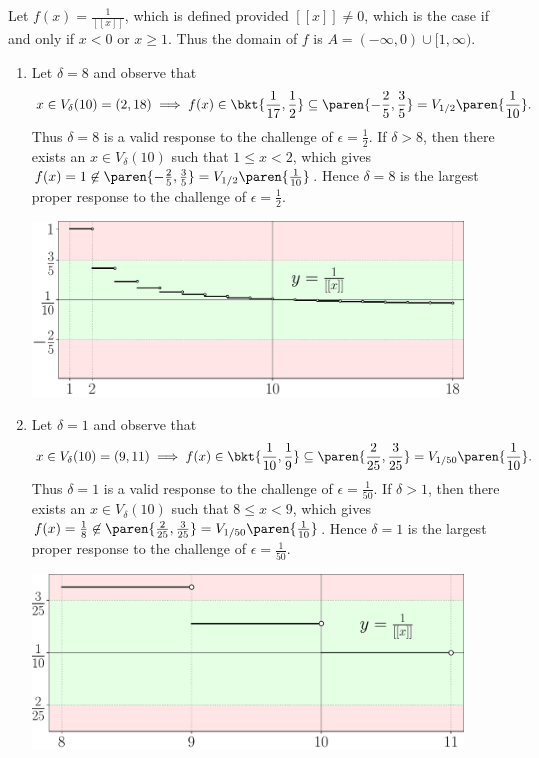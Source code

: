 \documentclass{lew98_solutions}
\begin{document}
\begin{solution}
    Let \( f(x) = \tfrac{1}{[[x]]} \), which is defined provided \( [[x]] \neq 0 \), which is the case if and only if \( x < 0 \) or \( x \geq 1 \). Thus the domain of \( f \) is \( A = (-\infty, 0) \cup [1, \infty) \).
    \begin{enumerate}
        \item Let \( \delta = 8 \) and observe that
        \[
            x \in V_{\delta}(10) = (2, 18) \implies f(x) \in \bkt{ \frac{1}{17}, \frac{1}{2} } \subseteq \paren{ -\frac{2}{5}, \frac{3}{5} } = V_{1/2}\paren{ \frac{1}{10} }.
        \]
        Thus \( \delta = 8 \) is a valid response to the challenge of \( \epsilon = \tfrac{1}{2} \). If \( \delta > 8 \), then there exists an \( x \in V_{\delta}(10) \) such that \( 1 \leq x < 2 \), which gives \( f(x) = 1 \not\in \paren{ -\tfrac{2}{5}, \tfrac{3}{5} } = V_{1/2} \paren{ \tfrac{1}{10} } \). Hence \( \delta = 8 \) is the largest proper response to the challenge of \( \epsilon = \tfrac{1}{2} \).
        \begin{center}
            \includegraphics[width=0.9\textwidth]{UA_Figures/UA_ex4_2_4_fig_1.pdf}
        \end{center}

        \item Let \( \delta = 1 \) and observe that
        \[
            x \in V_{\delta}(10) = (9, 11) \implies f(x) \in \bkt{ \frac{1}{10}, \frac{1}{9} } \subseteq \paren{ \frac{2}{25}, \frac{3}{25} } = V_{1/50} \paren{ \frac{1}{10} }.
        \]
        Thus \( \delta = 1 \) is a valid response to the challenge of \( \epsilon = \tfrac{1}{50} \). If \( \delta > 1 \), then there exists an \( x \in V_{\delta}(10) \) such that \( 8 \leq x < 9 \), which gives \( f(x) = \tfrac{1}{8} \not\in \paren{ \tfrac{2}{25}, \tfrac{3}{25} } = V_{1/50} \paren{ \tfrac{1}{10} } \). Hence \( \delta = 1 \) is the largest proper response to the challenge of \( \epsilon = \tfrac{1}{50} \).
        \begin{center}
            \includegraphics[width=0.9\textwidth]{UA_Figures/UA_ex4_2_4_fig_2.pdf}
        \end{center}


\end{enumerate}
\end{solution}
\end{document}
